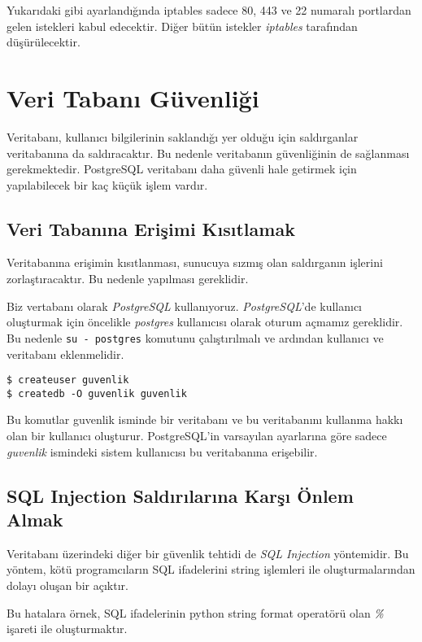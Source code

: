 \documentclass[11pt,a4paper]{report}
\begin{document}
Yukarıdaki gibi ayarlandığında iptables sadece 80, 443 ve 22 numaralı portlardan gelen istekleri kabul edecektir. Diğer bütün istekler \emph{iptables} tarafından düşürülecektir.

\section{Veri Tabanı Güvenliği}

Veritabanı, kullanıcı bilgilerinin saklandığı yer olduğu için saldırganlar veritabanına da saldıracaktır. Bu nedenle veritabanın güvenliğinin de sağlanması gerekmektedir. PostgreSQL veritabanı daha güvenli hale getirmek için yapılabilecek bir kaç küçük işlem vardır.

\subsection{Veri Tabanına Erişimi Kısıtlamak}

Veritabanına erişimin kısıtlanması, sunucuya sızmış olan saldırganın işlerini zorlaştıracaktır. Bu nedenle yapılması gereklidir.

Biz vertabanı olarak \emph{PostgreSQL} kullanıyoruz. \emph{PostgreSQL}'de kullanıcı oluşturmak için öncelikle \emph{postgres} kullanıcısı olarak oturum açmamız gereklidir. Bu nedenle \texttt{su - postgres} komutunu çalıştırılmalı ve ardından kullanıcı ve veritabanı eklenmelidir.

\begin{lstlisting}[caption=PostgreSQL Kullanıcı ve Verıtabanı Ekleme]
$ createuser guvenlik
$ createdb -O guvenlik guvenlik
\end{lstlisting}

Bu komutlar guvenlik isminde bir veritabanı ve bu veritabanını kullanma hakkı olan bir kullanıcı oluşturur. PostgreSQL'in varsayılan ayarlarına göre sadece \emph{guvenlik} ismindeki sistem kullanıcısı bu veritabanına erişebilir.

\subsection{SQL Injection Saldırılarına Karşı Önlem Almak}

Veritabanı üzerindeki diğer bir güvenlik tehtidi de \emph{SQL Injection} yöntemidir. Bu yöntem, kötü programcıların SQL ifadelerini string işlemleri ile oluşturmalarından dolayı oluşan bir açıktır.

Bu hatalara örnek, SQL ifadelerinin python string format operatörü olan \emph{\%} işareti ile oluşturmaktır.
\end{document}
